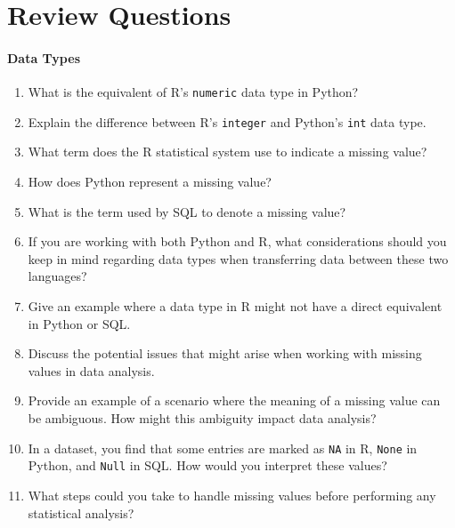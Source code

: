 \section{Review Questions}

\begin{withcode}
\paragraph*{Data Types}
\begin{enumerate}[nosep]
	\item What is the equivalent of R's \texttt{numeric} data type in Python?
	\item Explain the difference between R's \texttt{integer} and Python's \texttt{int} data type.
	\item What term does the R statistical system use to indicate a missing value?
	\item How does Python represent a missing value?
	\item What is the term used by SQL to denote a missing value?
	\item If you are working with both Python and R, what considerations should you keep in mind regarding data types when transferring data between these two languages?
	\item Give an example where a data type in R might not have a direct equivalent in Python or SQL.
	\item Discuss the potential issues that might arise when working with missing values in data analysis.
	\item Provide an example of a scenario where the meaning of a missing value can be ambiguous. How might this ambiguity impact data analysis?
	\item In a dataset, you find that some entries are marked as \texttt{NA} in R, \texttt{None} in Python, and \texttt{Null} in SQL. How would you interpret these values?
	\item What steps could you take to handle missing values before performing any statistical analysis?
\end{enumerate}
\end{withcode}


